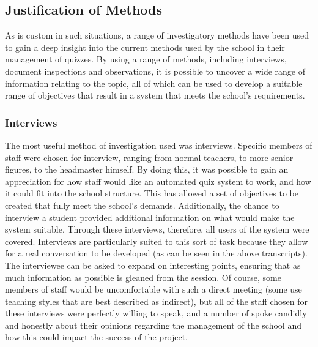 \subsection{Justification of Methods} %
\label{sub:justification_of_methods}
As is custom in such situations, a range of investigatory methods have been used to gain a deep insight into the current methods used by the school in their management of quizzes. By using a range of methods, including interviews, document inspections and observations, it is possible to uncover a wide range of information relating to the topic, all of which can be used to develop a suitable range of objectives that result in a system that meets the school's requirements.

\subsubsection{Interviews} %
\label{ssub:interviews}
The most useful method of investigation used was interviews. Specific members of staff were chosen for interview, ranging from normal teachers, to more senior figures, to the headmaster himself. By doing this, it was possible to gain an appreciation for how staff would like an automated quiz system to work, and how it could fit into the school structure. This has allowed a set of objectives to be created that fully meet the school's demands. Additionally, the chance to interview a student provided additional information on what would make the system suitable. Through these interviews, therefore, all users of the system were covered. Interviews are particularly suited to this sort of task because they allow for a real conversation to be developed (as can be seen in the above transcripts). The interviewee can be asked to expand on interesting points, ensuring that as much information as possible is gleaned from the session. Of course, some members of staff would be uncomfortable with such a direct meeting (some use teaching styles that are best described as indirect), but all of the staff chosen for these interviews were perfectly willing to speak, and a number of spoke candidly and honestly about their opinions regarding the management of the school and how this could impact the success of the project.

